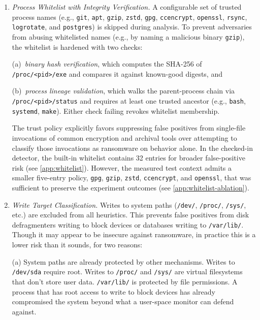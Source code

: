 \documentclass[twocolumn, 10pt]{scrartcl}
\begin{document}
\begin{enumerate}
    \item \textit{Process Whitelist with Integrity Verification.}
    A configurable set of trusted process names (e.g., \texttt{git}, \texttt{apt}, 
    \texttt{gzip}, \texttt{zstd}, \texttt{gpg}, \texttt{ccencrypt}, 
    \texttt{openssl}, \texttt{rsync}, \texttt{logrotate}, and \texttt{postgres}) 
    is skipped during analysis. To prevent adversaries from abusing whitelisted 
    names (e.g., by naming a malicious binary \texttt{gzip}), the whitelist is 
    hardened with two checks: 

    (a)~\emph{binary hash verification}, which computes the SHA-256 of 
    \texttt{/proc/<pid>/exe} and compares it against known-good digests, and 

    (b)~\emph{process lineage validation}, which walks the parent-process chain via 
    \texttt{/proc/<pid>/status} and requires at least one trusted ancestor (e.g., 
    \texttt{bash}, \texttt{systemd}, \texttt{make}). Either check failing revokes 
    whitelist membership.
    
    The trust policy explicitly favors 
    suppressing false positives from single-file invocations of common encryption and 
    archival tools over attempting to classify those invocations as ransomware on 
    behavior alone. In the checked-in detector, the built-in whitelist contains 32 
    entries for broader false-positive risk (see \cref{app:whitelist}). However,  the measured test context 
    admits a smaller five-entry policy, \texttt{gpg}, \texttt{gzip}, \texttt{zstd}, 
    \texttt{ccencrypt}, and \texttt{openssl}, that was sufficient to preserve the 
    experiment outcomes (see \cref{app:whitelist-ablation}).
    
    \item \textit{Write Target Classification.}
    Writes to system paths (\texttt{/dev/}, \texttt{/proc/}, \texttt{/sys/}, etc.) 
    are excluded from all heuristics. This prevents false positives from disk defragmenters writing to block devices or databases writing to \texttt{/var/lib/}. Though it may appear to be insecure against ransomware, in practice this is a lower risk than it sounds, for two reasons:

    (a) System paths are already protected by other mechanisms. Writes to \texttt{/dev/sda} require root. Writes to \texttt{/proc/} and \texttt{/sys/} are virtual filesystems that don't store user data. \texttt{/var/lib/} is protected by file permissions. A process that has root access to write to block devices has already compromised the system beyond what a user-space monitor can defend against.


\end{enumerate}
\end{document}

